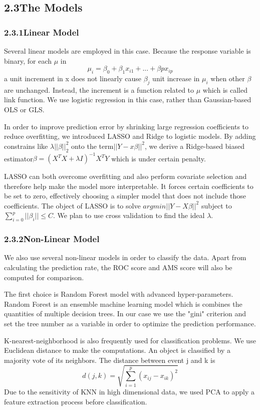\documentclass[11pt]{article}
\begin{document}
\subsection*{2.3\quad The Models}
\subsubsection*{2.3.1\quad Linear Model}
Several linear models are employed in this case. Because the response variable is binary, for each $\mu$ in
$$\mu_{i}=\beta_{0}+\beta_{1}x_{i1}+...+\beta{p}x_{ip}$$ 
 a unit increment in x does not linearly cause $\beta_{j}$ unit increase in $\mu_{i}$ when other $\beta$ are unchanged. Instead, the increment is a function related to $\mu$ which is called link function. We use logistic regression in this case, rather than Gaussian-based OLS or GLS. 

In order to improve prediction error by shrinking large regression coefficients to reduce overfitting, we introduced LASSO and Ridge to logistic models. By adding constrains like $\lambda||\beta||^{2}_{2}$ onto the term$||Y-x\beta||^{2}$, we derive a Ridge-based biased estimator$\beta=(X^{T}X+\lambda I)^{-1}X^{T}Y$ which is under certain penalty.

LASSO can both overcome overfitting and also perform covariate selection and therefore help make the model more interpretable. It forces certain coefficients to be set to zero, effectively choosing a simpler model that does not include those coefficients. The object of LASSO is to solve $argmin||Y-X\beta||^{2}$ subject to $\sum^{p}_{i=0}||\beta_{i}||\leq C$. We plan to use cross validation to find the ideal $\lambda$.

\subsubsection*{2.3.2\quad Non-Linear Model}
We also use several non-linear models in order to classify the data. Apart from calculating the prediction rate, the ROC score and AMS score will also be computed for comparison.

The first choice is Random Forest model with advanced hyper-parameters. Random Forest is an ensemble machine learning model which is combines the quantities of multiple decision trees. In our case we use the "gini" criterion and set the tree number as a variable in order to optimize the prediction performance.

K-nearest-neighborhood is also frequently used for classification problems. We use Euclidean distance to make the computations. An object is classified by a majority vote of its neighbors. The distance between event j and k is $$d(j,k)=\sqrt{\sum^{p}_{i=1}(x_{ij}-x_{ik})^{2}}$$ Due to the sensitivity of KNN in high dimensional data, we used PCA to apply a feature extraction process before classification. 
\end{document}
